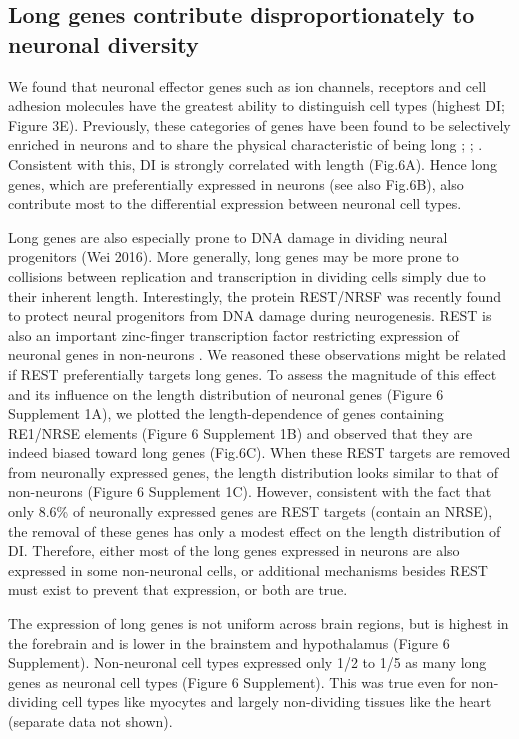 \subsection{Long genes contribute disproportionately to neuronal diversity}

We found that neuronal effector genes such as ion channels, receptors and cell adhesion molecules have the greatest ability to distinguish cell types (highest DI; Figure 3E). Previously, these categories of genes have been found to be selectively enriched in neurons and to share the physical characteristic of being long \cite{Sugino_2014}; \cite{Gabel_2015}; \cite{Zylka_2015}. Consistent with this, DI is strongly correlated with length (Fig.6A). Hence long genes, which are preferentially expressed in neurons (see also Fig.6B), also contribute most to the differential expression between neuronal cell types. 

Long genes are also especially prone to DNA damage in dividing neural progenitors (Wei 2016). More generally, long genes may be more prone to collisions between replication and transcription in dividing cells simply due to their inherent length. Interestingly, the protein REST/NRSF was recently found to protect neural progenitors from DNA damage during neurogenesis\cite{Nechiporuk_2016}. REST is also an important zinc-finger transcription factor restricting expression of neuronal genes in non-neurons \cite{RN1}\cite{RN2a}.  We reasoned these observations might be related if REST preferentially targets long genes. To assess the magnitude of this effect and its influence on the length distribution of neuronal genes (Figure 6 Supplement 1A), we plotted the length-dependence of genes containing RE1/NRSE elements (Figure 6 Supplement 1B) and observed that they are indeed biased toward long genes (Fig.6C). When these REST targets are removed from neuronally expressed genes, the length distribution looks similar to that of non-neurons (Figure 6 Supplement 1C). However, consistent with the fact that only 8.6\% of neuronally expressed genes are REST targets (contain an NRSE), the removal of these genes has only a modest effect on the length distribution of DI.  Therefore, either most of the long genes expressed in neurons are also expressed in some non-neuronal cells, or additional mechanisms besides REST must exist to prevent that expression, or both are true. 

The expression of long genes is not uniform across brain regions, but is highest in the forebrain and is lower in the brainstem and hypothalamus (Figure 6 Supplement). Non-neuronal cell types expressed only 1/2 to 1/5 as many long genes as neuronal cell types (Figure 6 Supplement). This was true even for non-dividing cell types like myocytes and largely non-dividing tissues like the heart (separate data not shown).

